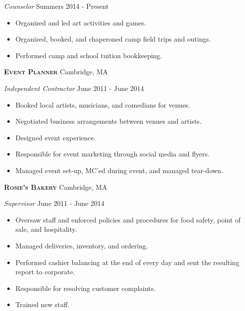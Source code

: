 \documentclass[a4paper]{article}
\begin{document}
\begin{addmargin}[1em]{0em}

\textit{Counselor} \hfill Summers 2014 - Present\\
\vspace{-1mm}
\begin{itemize} \itemsep 1pt
    \item Organized and led art activities and games.
    \item Organized, booked, and chaperoned camp field trips and outings.
    \item Performed camp and school tuition bookkeeping.
\end{itemize}
\end{addmargin}


\textbf{\textsc{Event Planner}} \hfill Cambridge, MA\\
\vspace{2mm}
\begin{addmargin}[1em]{0em}
\textit{Independent Contractor} \hfill June 2011 - June 2014\\
\vspace{-1mm}
\begin{itemize} \itemsep 1pt
    \item Booked local artists, musicians, and comedians for venues.
    \item Negotiated business arrangements between venues and artists.
    \item Designed event experience.
    \item Responsible for event marketing through social media and flyers.
    \item Managed event set-up, MC'ed during event, and managed tear-down.
\end{itemize}
\end{addmargin}

\textbf{\textsc{Rosie’s Bakery}} \hfill Cambridge, MA\\
\vspace{2mm}
\begin{addmargin}[1em]{0em}
\textit{Supervisor} \hfill June 2011 - June 2014\\
\vspace{-1mm}
\begin{itemize} \itemsep 1pt
    \item Oversaw staff and enforced policies and procedures for food safety, 
        point of sale, and hospitality.
    \item Managed deliveries, inventory, and ordering.
    \item Performed cashier balancing at the end of every day and sent the resulting
        report to corporate.  
    \item Responsible for resolving customer complaints.
    \item Trained new staff.
\end{itemize}
\end{addmargin}
\end{document}
